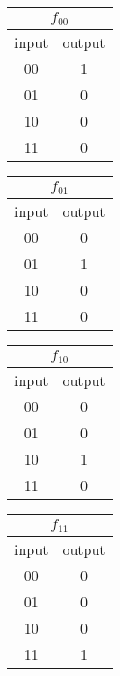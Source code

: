\documentclass[12pt,twoside,a4paper]{article}
\begin{document}
\begin{center}
        \begin{tabular}[t]{|c|c|}
                \hline
                \multicolumn{2}{|c|}{$f_{00}$} \\
                \hline
                input & output \\
                \hline
                00 & 1 \\
                01 & 0 \\
                10 & 0 \\
                11 & 0 \\
                \hline
        \end{tabular}
        \begin{tabular}[t]{|c|c|}
                \hline
                \multicolumn{2}{|c|}{$f_{01}$} \\
                \hline
                input & output \\
                \hline
                00 & 0 \\
                01 & 1 \\
                10 & 0 \\
                11 & 0 \\
                \hline
        \end{tabular}
        \begin{tabular}[t]{|c|c|}
                \hline
                \multicolumn{2}{|c|}{$f_{10}$} \\
                \hline
                input & output \\
                \hline
                00 & 0 \\
                01 & 0 \\
                10 & 1 \\
                11 & 0 \\
                \hline
        \end{tabular}
        \begin{tabular}[t]{|c|c|}
                \hline
                \multicolumn{2}{|c|}{$f_{11}$} \\
                \hline
                input & output \\
                \hline
                00 & 0 \\
                01 & 0 \\
                10 & 0 \\
                11 & 1 \\
                \hline
        \end{tabular}
\end{center}
\end{document}
